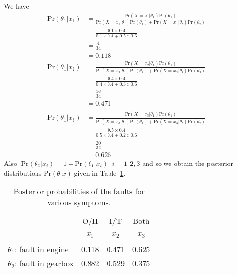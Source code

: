 {{    We have
    \begin{align*}
    \text{Pr}(\theta_1|x_1)
    &=\frac{\text{Pr}(X=x_1|\theta_1)\text{Pr}(\theta_1)}
    {\text{Pr}(X=x_1|\theta_1)\text{Pr}(\theta_1)+\text{Pr}(X=x_1|\theta_2)\text{Pr}(\theta_2)} \\
    &=\frac{0.1\times 0.4}{0.1\times 0.4+0.5\times 0.6} \\
    &=\frac{4}{34} \\
    &=0.118
    \end{align*}
    \begin{align*}
    \text{Pr}(\theta_1|x_2)
    &=\frac{\text{Pr}(X=x_2|\theta_1)\text{Pr}(\theta_1)}
    {\text{Pr}(X=x_2|\theta_1)\text{Pr}(\theta_1)+\text{Pr}(X=x_2|\theta_2)\text{Pr}(\theta_2)} \\
    &=\frac{0.4\times 0.4}{0.4\times 0.4+0.3\times 0.6} \\
    &=\frac{16}{34} \\
    &=0.471 \\ \\
    \text{Pr}(\theta_1|x_3)
    &=\frac{\text{Pr}(X=x_3|\theta_1)\text{Pr}(\theta_1)}
    {\text{Pr}(X=x_3|\theta_1)\text{Pr}(\theta_1)+\text{Pr}(X=x_3|\theta_2)\text{Pr}(\theta_2)} \\
    &=\frac{0.5\times 0.4}{0.5\times 0.4+0.2\times 0.6} \\
    &=\frac{20}{32} \\
    &=0.625
    \end{align*}
    Also, $\text{Pr}(\theta_2|x_i)=1-\text{Pr}(\theta_1|x_i)$, $i=1,2,3$ and so we
    obtain the posterior distributions $\text{Pr}(\theta|x)$ given in
    Table~\ref{tab:garagepost}.
    
}

\begin{table}[!h]
\bigskip

\begin{tabular}{|l|c|c|c|}
\cline{2-4}
\multicolumn{1}{c|}{~}& O/H & I/T & Both \\
\multicolumn{1}{c|}{~}& $x_1$ & $x_2$ & $x_3$ \\
\hline
$\theta_1$: fault in engine & 0.118 & 0.471 & 0.625 \\
$\theta_2$: fault in gearbox & 0.882 & 0.529 & 0.375 \\
\hline
\end{tabular}
\caption{Posterior probabilities of the faults for various symptoms.}
\label{tab:garagepost}

\end{table}

}
